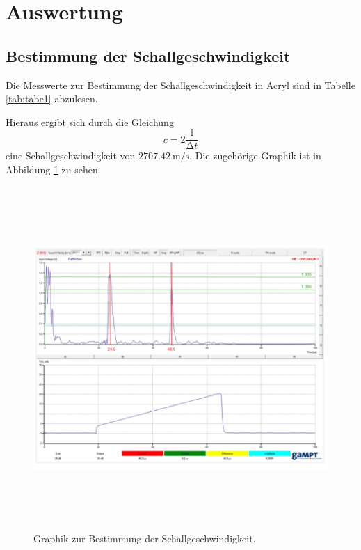 \section{Auswertung}
\subsection{Bestimmung der Schallgeschwindigkeit}

Die Messwerte zur Bestimmung der Schallgeschwindigkeit in Acryl sind in Tabelle
\ref{tab:tabe1} abzulesen.

Hieraus ergibt sich durch die Gleichung
\begin{equation}
  c = 2\frac{\text{l}}{\increment t}
\end{equation}
eine Schallgeschwindigkeit von $ \SI{2707.42}{\meter\per\second}$.
Die zugehörige Graphik ist in Abbildung \ref{fig:bums} zu sehen.
\begin{figure}[H]
  \centering
  \includegraphics[height=13cm]{Bums.png}
  \caption{Graphik zur Bestimmung der Schallgeschwindigkeit.}
  \label{fig:bums}
\end{figure}


